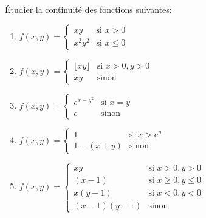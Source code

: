 
\begin{exercice}\label{exocontinueSup0003}

 Étudier la continuité des fonctions suivantes:
	\begin{enumerate}
		\item $f(x,y)=
			\begin{cases}
				xy	&	\text{si }x>0\\
				x^2y^2	&	 \text{si }x\leq 0
			\end{cases}$

		\item $f(x,y)= 
			\begin{cases}
				\lfloor xy\rfloor	&	\text{si }x>0,y>0\\
				xy	&	 \text{sinon}
			\end{cases}$

		\item $f(x,y)=
			\begin{cases}
				 e^{x-y^2}	&	\text{si }x=y\\
				e	&	 \text{sinon}
			\end{cases}$

		\item $f(x,y)=
			\begin{cases}
				1&	\text{si }x>e^y\\
				1-(x+y)	&	 \text{sinon}
			\end{cases}$

									       
		\item $f(x,y)=
			\begin{cases}
				xy	&	\text{si }x>0,y>0\\
				(x-1)	&	 \text{si }x\geq 0,y\leq 0\\
				x(y-1)	&	 \text{si }x<0,y<0\\
				(x-1)(y-1)	&	 \text{sinon}
			\end{cases}$
	\end{enumerate}

\end{exercice}
